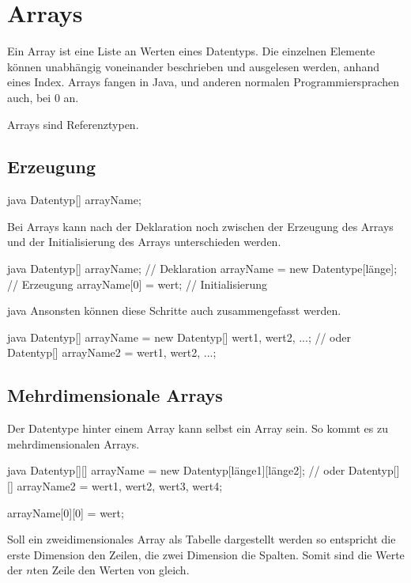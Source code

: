 \documentclass{article}
\begin{document}
\section{Arrays}
Ein Array ist eine Liste an Werten eines Datentyps. Die einzelnen Elemente können unabhängig voneinander beschrieben und ausgelesen werden, anhand eines Index. Arrays fangen in Java, und anderen normalen Programmiersprachen auch, bei 0 an.

Arrays sind Referenztypen.

\subsection{Erzeugung}
\begin{sourcecode}{java}
Datentyp[] arrayName;
\end{sourcecode}
Bei Arrays kann nach der Deklaration noch zwischen der Erzeugung des Arrays und der Initialisierung des Arrays unterschieden werden.
\begin{sourcecode}{java}
Datentyp[] arrayName; // Deklaration
arrayName = new Datentype[länge]; // Erzeugung
arrayName[0] = wert; // Initialisierung
\end{sourcecode}{java}
Ansonsten können diese Schritte auch zusammengefasst werden.
\begin{sourcecode}{java}
Datentyp[] arrayName = new Datentyp[] {wert1, wert2, ...}; // oder
Datentyp[] arrayName2 = {wert1, wert2, ...};
\end{sourcecode}

\subsection{Mehrdimensionale Arrays}
Der Datentype hinter einem Array kann selbst ein Array sein. So kommt es zu mehrdimensionalen Arrays.
\begin{sourcecode}{java}
Datentyp[][] arrayName = new Datentyp[länge1][länge2]; // oder
Datentyp[][] arrayName2 = {{wert1, wert2}, {wert3, wert4}};

arrayName[0][0] = wert;
\end{sourcecode}

Soll ein zweidimensionales Array als Tabelle dargestellt werden so entspricht \idr die erste Dimension den Zeilen, die zwei Dimension die Spalten. Somit sind die Werte der $n$ten Zeile den Werten von  gleich.
\end{document}

